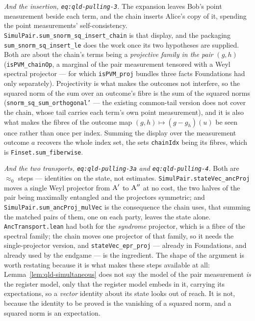 \emph{And the insertion, \texttt{eq:qld-pulling-3}.} The expansion leaves Bob's point measurement
beside each term, and the chain inserts Alice's copy of it, spending the point measurements'
self-consistency. \texttt{SimulPair.sum\_snorm\_sq\_insert\_chain} is that display, and the
packaging \texttt{sum\_snorm\_sq\_insert\_le} does the work once its two hypotheses are supplied.
Both are about the chain's terms being a \emph{projective family in the pair} $(g,h)$
(\texttt{isPVM\_chainOp}, a marginal of the pair measurement tensored with a Weyl spectral
projector --- for which \texttt{isPVM\_proj} bundles three facts Foundations had only separately).
Projectivity is what makes the outcomes not interfere, so the squared norm of the sum over an
outcome's fibre is the sum of the squared norms
(\texttt{snorm\_sq\_sum\_orthogonal'} --- the existing common-tail version does not cover the
chain, whose tail carries each term's own point measurement), and it is also what makes the fibres
of the outcome map $(g,h) \mapsto (g - g_h)(u)$ be seen once rather than once per index. Summing
the display over the measurement outcome $a$ recovers the whole index set, the sets
\texttt{chainIdx} being its fibres, which is \texttt{Finset.sum\_fiberwise}.

\emph{And the two transports, \texttt{eq:qld-pulling-3a} and \texttt{eq:qld-pulling-4}.} Both are
$\approx_0$ steps --- identities on the state, not estimates.
\texttt{SimulPair.stateVec\_ancProj} moves a single Weyl projector from $\textsc{A}'$ to $\textsc{A}''$ at
no cost, the two halves of the pair being maximally entangled and the projectors symmetric; and
\texttt{SimulPair.sum\_ancProj\_mulVec} is the consequence the chain uses, that summing the matched
pairs of them, one on each party, leaves the state alone. \texttt{AncTransport.lean} had both for
the \emph{syndrome} projector, which is a fibre of the spectral family; the chain moves one
projector of that family, so it needs the single-projector version, and
\texttt{stateVec\_epr\_proj} --- already in Foundations, and already used by the endgame --- is the
ingredient. The shape of the argument is worth restating because it is what makes these steps
available at all: Lemma~\ref{lem:qld-simultaneous} does not say the model of the pair measurement
\emph{is} the register model, only that the register model embeds in it, carrying its
expectations, so a \emph{vector} identity about its state looks out of reach. It is not, because
the identity to be proved is the vanishing of a squared norm, and a squared norm is an
expectation.

